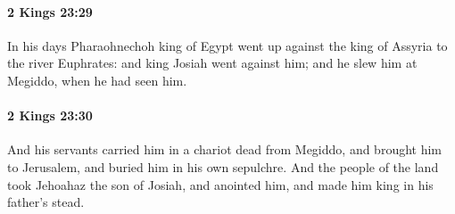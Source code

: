 		\paragraph{2 Kings 23:29} %
			\label{2KINGS-23-29}

			In his days Pharaohnechoh king of Egypt went up against the king of Assyria to the river Euphrates: and king Josiah went against him; and he slew him at Megiddo, when he had seen him.


		\paragraph{2 Kings 23:30} %
			\label{2KINGS-23-30}

			And his servants carried him in a chariot dead from Megiddo, and brought him to Jerusalem, and buried him in his own sepulchre. And the people of the land took Jehoahaz the son of Josiah, and anointed him, and made him king in his father’s stead.

